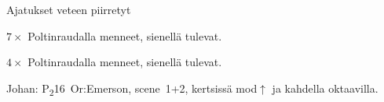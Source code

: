 \documentclass[12pt,a4paper]{article}
\begin{document}
\begin{SBVerse*}
   
   
\end{SBVerse*}

\begin{SBVerse}
Ajatukset  veteen piirretyt

$7\times$ Poltinraudalla  menneet, sienellä
 tulevat.

    
  

$4\times$ Poltinraudalla  menneet, sienellä
 tulevat.
\end{SBVerse}


{\SBLyricNoteFont Johan: P\textsubscript{2}16~Or:Emerson, scene~1+2, kertsissä
mod$\uparrow$ ja kahdella oktaavilla.}
\end{document}
